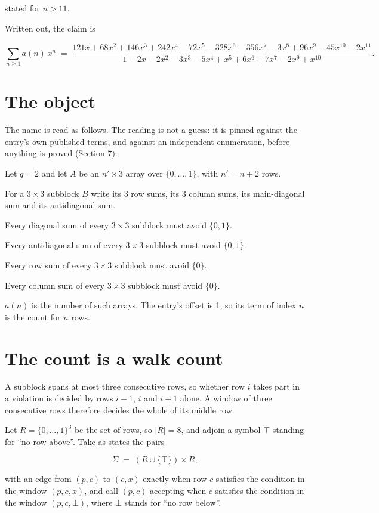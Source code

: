 \documentclass[11pt]{article}
\theoremstyle{definition}
\begin{document}
stated for $n > 11$.

Written out, the claim is

\[\sum_{n \ge 1} a(n)\,x^n \;=\; \frac{121x + 68x^{2} + 146x^{3} + 242x^{4} - 72x^{5} - 328x^{6} - 356x^{7} - 3x^{8} + 96x^{9} - 45x^{10} - 2x^{11}}{1 - 2x - 2x^{2} - 3x^{3} - 5x^{4} + x^{5} + 6x^{6} + 7x^{7} - 2x^{9} + x^{10}}.\]

\section{The object}

The name is read as follows. The reading is not a guess: it is pinned against the entry's own published terms, and against an independent enumeration, before anything is proved (Section 7).

Let $q = 2$ and let $A$ be an $n' \times 3$ array over $\{0,\dots,1\}$, with $n' = n + 2$ rows.

For a $3\times3$ subblock $B$ write its 3 row sums, its 3 column sums, its main-diagonal sum and its antidiagonal sum.

Every diagonal sum of every $3\times3$ subblock must avoid $\{0, 1\}$.

Every antidiagonal sum of every $3\times3$ subblock must avoid $\{0, 1\}$.

Every row sum of every $3\times3$ subblock must avoid $\{0\}$.

Every column sum of every $3\times3$ subblock must avoid $\{0\}$.

$a(n)$ is the number of such arrays. The entry's offset is 1, so its term of index $n$ is the count for $n$ rows.

\section{The count is a walk count}

A subblock spans at most three consecutive rows, so whether row $i$ takes part in a violation is decided by rows $i-1$, $i$ and $i+1$ alone. A window of three consecutive rows therefore decides the whole of its middle row.

Let $R = \{0,\dots,1\}^{3}$ be the set of rows, so $|R| = 8$, and adjoin a symbol $\top$ standing for ``no row above''. Take as states the pairs

\[\Sigma \;=\; (R \cup \{\top\}) \times R,\]

with an edge from $(p,c)$ to $(c,x)$ exactly when row $c$ satisfies the condition in the window $(p,c,x)$, and call $(p,c)$ accepting when $c$ satisfies the condition in the window $(p,c,\bot)$, where $\bot$ stands for ``no row below''.
\end{document}
